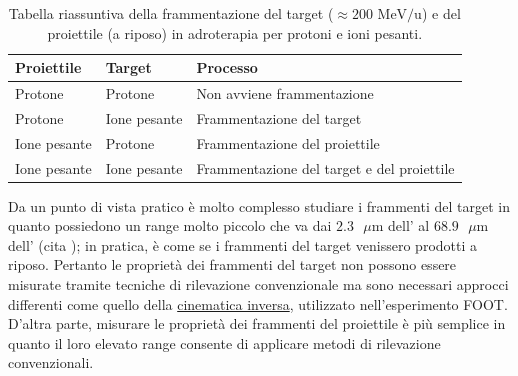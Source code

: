 \documentclass[12pt,a4paper,twoside]{report}
\begin{document}
	\begin{table}[H]
		\begin{minipage}{\textwidth}
			\centering
			\begin{tabular}{ |M{2.5cm}|M{2.5cm}||m{9cm}| }
				\hline
				Proiettile & Target & Processo\\
				\hline\hline
				Protone & Protone & Non avviene frammentazione\\
				\hline
				Protone & Ione pesante & Frammentazione del target\\
				\hline
				Ione pesante & Protone & Frammentazione del proiettile\\
				\hline
				Ione pesante & Ione pesante & Frammentazione del target e del proiettile\\
				\hline
			\end{tabular}
		\end{minipage}
		\caption{Tabella riassuntiva della frammentazione del target ($\approx200\mbox{ MeV/u}$) e del proiettile (a riposo) in adroterapia per protoni e ioni pesanti.}
		\label{tab:fragmentation}
	\end{table}
	
	 Da un punto di vista pratico è molto complesso studiare i frammenti del target in quanto possiedono un range molto piccolo che va dai $2.3\mbox{ }\mu\mbox{m}$ dell' al $68.9\mbox{ }\mu\mbox{m}$ dell' (cita
	 ); in pratica, è come se i frammenti del target venissero prodotti a riposo. Pertanto le proprietà dei frammenti del target non possono essere misurate tramite tecniche di rilevazione convenzionale ma sono necessari approcci differenti come quello della \hyperref[?ref a secondo cap?]{cinematica inversa}, utilizzato nell'esperimento FOOT. D'altra parte, misurare le proprietà dei frammenti del proiettile è più semplice in quanto il loro elevato range consente di applicare metodi di rilevazione convenzionali.
	 
\end{document}

